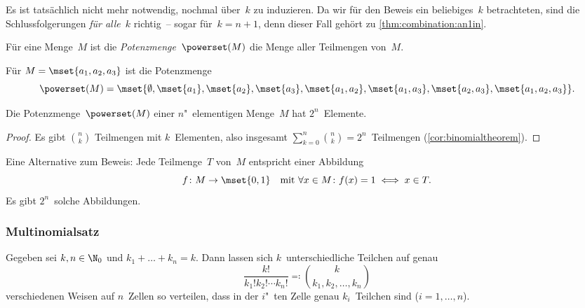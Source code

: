 \documentclass[a4paper]{article}
\begin{document}
\begin{remark}
    Es ist tatsächlich nicht mehr notwendig, nochmal über~$k$ zu induzieren. Da wir für den Beweis ein beliebiges~$k$ betrachteten, sind die Schlussfolgerungen \emph{für alle}~$k$ richtig~-- sogar für~$k = n + 1$, denn dieser Fall gehört zu \cref{thm:combination:an1in}.
\end{remark}

\begin{definition}
    Für eine Menge~$M$ ist die \emph{Potenzmenge}~$\powerset(M)$ die Menge aller Teilmengen von~$M$.
\end{definition}

\begin{example}
    Für $M = \mset{a_1, a_2, a_3}$ ist die Potenzmenge
    \begin{equation*}
        \powerset(M) = \mset{\emptyset, \mset{a_1}, \mset{a_2}, \mset{a_3}, \mset{a_1, a_2}, \mset{a_1, a_3}, \mset{a_2, a_3}, \mset{a_1, a_2, a_3}}.
    \end{equation*}
\end{example}

\begin{theorem}
    Die Potenzmenge~$\powerset(M)$ einer $n$"~elementigen Menge~$M$ hat $2^n$~Elemente.
\end{theorem}

\begin{proof}
    Es gibt $\binom{n}{k}$ Teilmengen mit $k$~Elementen, also insgesamt $\sum_{k = 0}^n \binom{n}{k} = 2^n$~Teilmengen (\cref{cor:binomialtheorem}).
\end{proof}

\begin{remark}
    Eine Alternative zum Beweis: Jede Teilmenge~$T$ von~$M$ entspricht einer Abbildung
    \begin{equation*}
        f\colon M \to \mset{0, 1} \quad\text{mit } \forall x \in M\colon f(x) = 1 \iff x \in T.
    \end{equation*}
    Es gibt $2^n$~solche Abbildungen.
\end{remark}

\subsubsection{Multinomialsatz}

\begin{theorem}[Multinomialkoeffizient]
    Gegeben sei $k, n \in \N_0$ und $k_1 + \dots + k_n = k$. Dann lassen sich $k$~unterschiedliche Teilchen auf genau
    \begin{equation*}
        \frac{k!}{k_1! k_2! \cdots k_n!}  \eqqcolon \binom{k}{k_1, k_2, \dots, k_n}
    \end{equation*}
    verschiedenen Weisen auf $n$~Zellen so verteilen, dass in der $i$"~ten Zelle genau $k_i$~Teilchen sind ($i = 1, \dots, n$).
\end{theorem}
\end{document}
